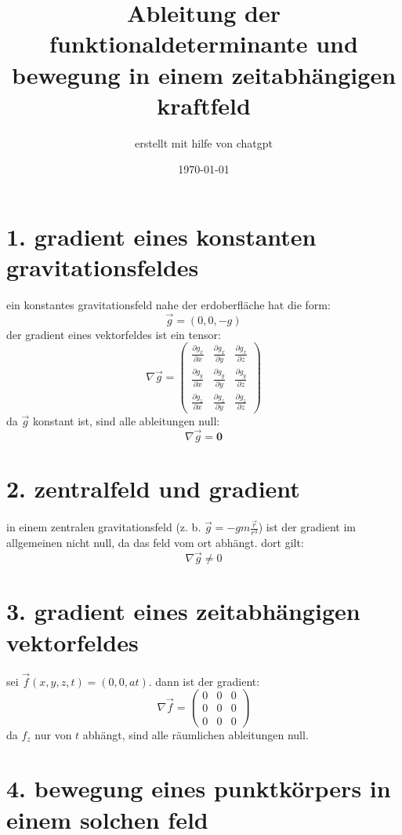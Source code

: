 \documentclass[a4paper,12pt]{article}
\title{Ableitung der funktionaldeterminante und bewegung in einem zeitabhängigen kraftfeld}
\author{erstellt mit hilfe von chatgpt}
\date{\today}
\begin{document}
\maketitle

\section*{1. gradient eines konstanten gravitationsfeldes}

ein konstantes gravitationsfeld nahe der erdoberfläche hat die form:
\[
\vec{g} = (0, 0, -g)
\]
der gradient eines vektorfeldes ist ein tensor:
\[
\nabla \vec{g} = \begin{pmatrix}
\frac{\partial g_x}{\partial x} & \frac{\partial g_x}{\partial y} & \frac{\partial g_x}{\partial z} \\
\frac{\partial g_y}{\partial x} & \frac{\partial g_y}{\partial y} & \frac{\partial g_y}{\partial z} \\
\frac{\partial g_z}{\partial x} & \frac{\partial g_z}{\partial y} & \frac{\partial g_z}{\partial z}
\end{pmatrix}
\]
da $\vec{g}$ konstant ist, sind alle ableitungen null:
\[
\nabla \vec{g} = \mathbf{0}
\]

\section*{2. zentralfeld und gradient}

in einem zentralen gravitationsfeld (z. b. $\vec{g} = -g m \frac{\vec{r}}{r^3}$) ist der gradient im allgemeinen nicht null, da das feld vom ort abhängt. dort gilt:
\[
\nabla \vec{g} \neq 0
\]

\section*{3. gradient eines zeitabhängigen vektorfeldes}

sei $\vec{f}(x, y, z, t) = (0, 0, a t)$. dann ist der gradient:
\[
\nabla \vec{f} = \begin{pmatrix}
0 & 0 & 0 \\
0 & 0 & 0 \\
0 & 0 & 0
\end{pmatrix}
\]
da $f_z$ nur von $t$ abhängt, sind alle räumlichen ableitungen null.

\section*{4. bewegung eines punktkörpers in einem solchen feld}
\end{document}
